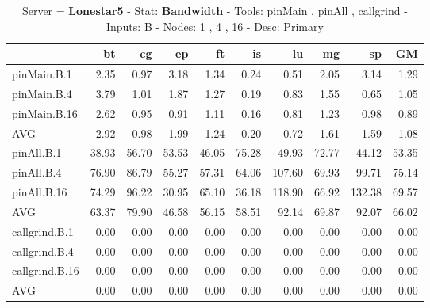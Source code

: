 \begin{table*}[]
\caption{Server = \textbf{Lonestar5} - Stat: \textbf{Bandwidth} - 
 Tools: pinMain , pinAll , callgrind -  
 Inputs: B -
 Nodes: 1 , 4 , 16 -
 Desc: Primary}
\label{ls5_bw_pMpAcg_B_itn_p3.5}\begin{center}
\begin{tabular}{|l|rrrrrrrr|r|}
\hline
                &    bt &    cg &    ep &    ft &    is &     lu &    mg &     sp &    GM \\
\hline
 pinMain.B.1    &  2.35 &  0.97 &  3.18 &  1.34 &  0.24 &   0.51 &  2.05 &   3.14 &  1.29 \\
 pinMain.B.4    &  3.79 &  1.01 &  1.87 &  1.27 &  0.19 &   0.83 &  1.55 &   0.65 &  1.05 \\
 pinMain.B.16   &  2.62 &  0.95 &  0.91 &  1.11 &  0.16 &   0.81 &  1.23 &   0.98 &  0.89 \\
 \hline
 AVG            &  2.92 &  0.98 &  1.99 &  1.24 &  0.20 &   0.72 &  1.61 &   1.59 &  1.08 \\
 \hline
 pinAll.B.1     & 38.93 & 56.70 & 53.53 & 46.05 & 75.28 &  49.93 & 72.77 &  44.12 & 53.35 \\
 pinAll.B.4     & 76.90 & 86.79 & 55.27 & 57.31 & 64.06 & 107.60 & 69.93 &  99.71 & 75.14 \\
 pinAll.B.16    & 74.29 & 96.22 & 30.95 & 65.10 & 36.18 & 118.90 & 66.92 & 132.38 & 69.57 \\
 \hline
 AVG            & 63.37 & 79.90 & 46.58 & 56.15 & 58.51 &  92.14 & 69.87 &  92.07 & 66.02 \\
 \hline
 callgrind.B.1  &  0.00 &  0.00 &  0.00 &  0.00 &  0.00 &   0.00 &  0.00 &   0.00 &  0.00 \\
 callgrind.B.4  &  0.00 &  0.00 &  0.00 &  0.00 &  0.00 &   0.00 &  0.00 &   0.00 &  0.00 \\
 callgrind.B.16 &  0.00 &  0.00 &  0.00 &  0.00 &  0.00 &   0.00 &  0.00 &   0.00 &  0.00 \\
 \hline
 AVG            &  0.00 &  0.00 &  0.00 &  0.00 &  0.00 &   0.00 &  0.00 &   0.00 &  0.00 \\
\hline
\end{tabular}
\end{center}
\end{table*}
